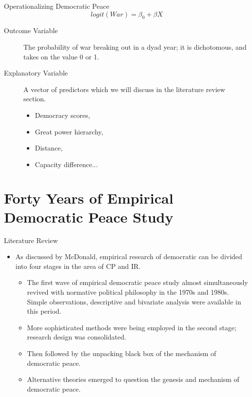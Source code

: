 \documentclass{beamer}
\begin{document}
	\begin{frame}{Operationalizing Democratic Peace}
		\begin{equation}
			logit(War) = \beta_0 + \beta X
		\end{equation}
		\begin{description}
			\item[Outcome Variable] The probability of war breaking out in a dyad year; it is dichotomous, and takes on the value 0 or 1.
			\item[Explanatory Variable] A vector of predictors which we will discuss in the literature review section.
			\begin{itemize}
				\item Democracy scores,
				\item Great power hierarchy,
				\item Distance,
				\item Capacity difference...
			\end{itemize}
		\end{description}
	\end{frame}

	\section{Forty Years of Empirical Democratic Peace Study}
	
	\begin{frame}{Literature Review}
		\begin{itemize}
			\item As discussed by McDonald, \autocite{mcdonaldGreatPowersHierarchy2015} empirical research of democratic can be divided into four stages in the area of CP and IR.
			\begin{itemize}
				\item The first wave of empirical democratic peace study almost simultaneously revived with normative political philosophy in the 1970s and 1980s. Simple observations, descriptive and bivariate analysis were available in this period.
				\item More sophisticated methods were being employed in the second stage; research design was consolidated.
				\item Then followed by the unpacking black box of the mechanism of democratic peace.
				\item Alternative theories emerged to question the genesis and mechanism of democratic peace.
			\end{itemize}
		\end{itemize}
	\end{frame}
	
\end{document}
